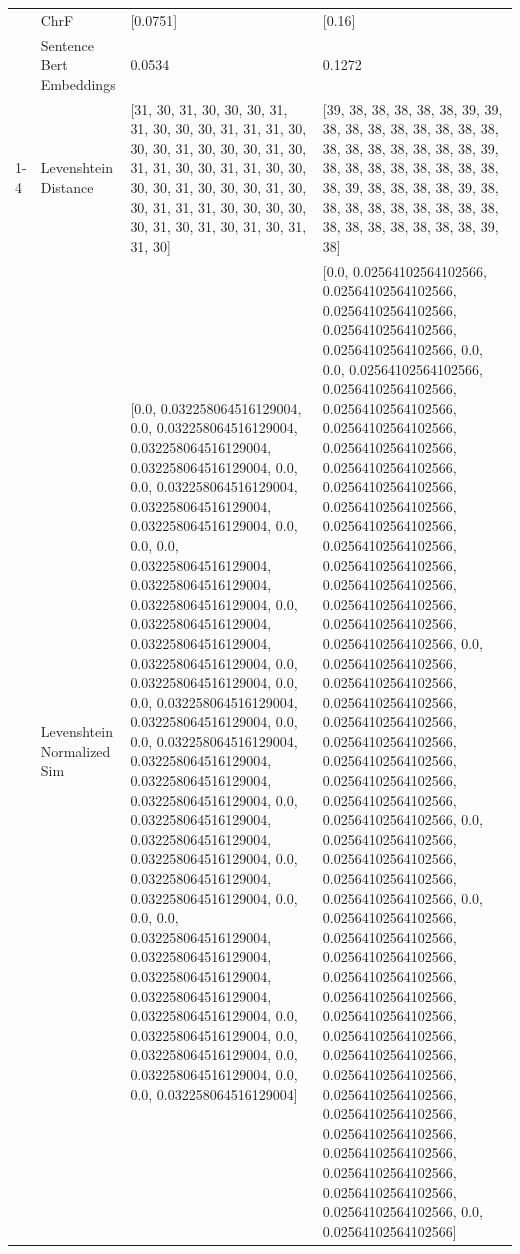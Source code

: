 \begin{tabular}{llll}
 & ChrF & [0.0751] & [0.16] \\
 & Sentence Bert Embeddings & 0.0534 & 0.1272 \\
\cline{1-4}
\multirow[t]{4}{*}{Cira wa mucii ndumagirio kiharo} & Levenshtein Distance & [31, 30, 31, 30, 30, 30, 31, 31, 30, 30, 30, 31, 31, 31, 30, 30, 30, 31, 30, 30, 30, 31, 30, 31, 31, 30, 30, 31, 31, 30, 30, 30, 30, 31, 30, 30, 30, 31, 30, 30, 31, 31, 31, 30, 30, 30, 30, 30, 31, 30, 31, 30, 31, 30, 31, 31, 30] & [39, 38, 38, 38, 38, 38, 39, 39, 38, 38, 38, 38, 38, 38, 38, 38, 38, 38, 38, 38, 38, 38, 38, 39, 38, 38, 38, 38, 38, 38, 38, 38, 38, 39, 38, 38, 38, 38, 39, 38, 38, 38, 38, 38, 38, 38, 38, 38, 38, 38, 38, 38, 38, 38, 38, 39, 38] \\
 & Levenshtein Normalized Sim & [0.0, 0.032258064516129004, 0.0, 0.032258064516129004, 0.032258064516129004, 0.032258064516129004, 0.0, 0.0, 0.032258064516129004, 0.032258064516129004, 0.032258064516129004, 0.0, 0.0, 0.0, 0.032258064516129004, 0.032258064516129004, 0.032258064516129004, 0.0, 0.032258064516129004, 0.032258064516129004, 0.032258064516129004, 0.0, 0.032258064516129004, 0.0, 0.0, 0.032258064516129004, 0.032258064516129004, 0.0, 0.0, 0.032258064516129004, 0.032258064516129004, 0.032258064516129004, 0.032258064516129004, 0.0, 0.032258064516129004, 0.032258064516129004, 0.032258064516129004, 0.0, 0.032258064516129004, 0.032258064516129004, 0.0, 0.0, 0.0, 0.032258064516129004, 0.032258064516129004, 0.032258064516129004, 0.032258064516129004, 0.032258064516129004, 0.0, 0.032258064516129004, 0.0, 0.032258064516129004, 0.0, 0.032258064516129004, 0.0, 0.0, 0.032258064516129004] & [0.0, 0.02564102564102566, 0.02564102564102566, 0.02564102564102566, 0.02564102564102566, 0.02564102564102566, 0.0, 0.0, 0.02564102564102566, 0.02564102564102566, 0.02564102564102566, 0.02564102564102566, 0.02564102564102566, 0.02564102564102566, 0.02564102564102566, 0.02564102564102566, 0.02564102564102566, 0.02564102564102566, 0.02564102564102566, 0.02564102564102566, 0.02564102564102566, 0.02564102564102566, 0.02564102564102566, 0.0, 0.02564102564102566, 0.02564102564102566, 0.02564102564102566, 0.02564102564102566, 0.02564102564102566, 0.02564102564102566, 0.02564102564102566, 0.02564102564102566, 0.02564102564102566, 0.0, 0.02564102564102566, 0.02564102564102566, 0.02564102564102566, 0.02564102564102566, 0.0, 0.02564102564102566, 0.02564102564102566, 0.02564102564102566, 0.02564102564102566, 0.02564102564102566, 0.02564102564102566, 0.02564102564102566, 0.02564102564102566, 0.02564102564102566, 0.02564102564102566, 0.02564102564102566, 0.02564102564102566, 0.02564102564102566, 0.02564102564102566, 0.02564102564102566, 0.02564102564102566, 0.0, 0.02564102564102566] \\

\end{tabular}
